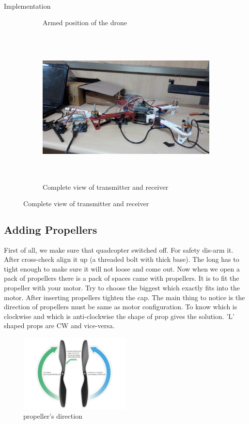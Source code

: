 \documentclass[12pt, oneside]{report}
\numberwithin{equation}{section}
\begin{document}
\begin{chapter}{Implementation}
\begin{figure}[h]
\begin{subfigure}[hb]{0.3\textwidth}
\caption{Armed position of the drone}
\end{subfigure}
\begin{subfigure}[hb]{0.3\textwidth}
\includegraphics[width=\textwidth, height=8cm]{trans}
\caption{Complete view of transmitter and receiver}
\end{subfigure}
\end{figure}


\subsection{Adding Propellers}

First of all, we make sure that quadcopter switched off. For safety dis-arm it. After cross-check align it up (a threaded bolt with thick base). The long has to tight enough to make sure it will not loose and come out. Now when we open a pack of propellers there is a pack of spaces came with propellers. It is to fit the propeller with your motor. Try to choose the biggest which exactly fits into the motor. After inserting propellers tighten the cap. The main thing to notice is the direction of propellers must be same as motor configuration. To know which is clockwise and which is anti-clockwise the shape of prop gives the solution. 'L' shaped props are CW and vice-versa.\\
\begin{figure}[h]
\center
\includegraphics[width=0.5\textwidth]{props}
\caption{propeller's direction}
\end{figure}


\end{chapter}
\end{document}
